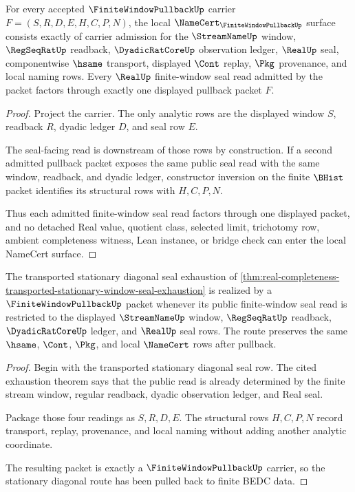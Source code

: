 \begin{theorem}
\label{thm:finite-window-pullback-namecert-obligations}
For every accepted $\FiniteWindowPullbackUp$ carrier $F=(S,R,D,E,H,C,P,N)$, the local $\NameCert_{\FiniteWindowPullbackUp}$ surface consists exactly of carrier admission for the $\StreamNameUp$ window, $\RegSeqRatUp$ readback, $\DyadicRatCoreUp$ observation ledger, $\RealUp$ seal, componentwise $\hsame$ transport, displayed $\Cont$ replay, $\Pkg$ provenance, and local naming rows. Every $\RealUp$ finite-window seal read admitted by the packet factors through exactly one displayed pullback packet $F$.
\end{theorem}
\begin{proof}
Project the carrier. The only analytic rows are the displayed window $S$, readback $R$, dyadic ledger $D$, and seal row $E$.

The seal-facing read is downstream of those rows by construction. If a second admitted pullback packet exposes the same public seal read with the same window, readback, and dyadic ledger, constructor inversion on the finite $\BHist$ packet identifies its structural rows with $H,C,P,N$.

Thus each admitted finite-window seal read factors through one displayed packet, and no detached Real value, quotient class, selected limit, trichotomy row, ambient completeness witness, Lean instance, or bridge check can enter the local NameCert surface.
\end{proof}

\begin{theorem}
\label{thm:finite-window-pullback-stationary-diagonal-route}
The transported stationary diagonal seal exhaustion of \autoref{thm:real-completeness-transported-stationary-window-seal-exhaustion} is realized by a $\FiniteWindowPullbackUp$ packet whenever its public finite-window seal read is restricted to the displayed $\StreamNameUp$ window, $\RegSeqRatUp$ readback, $\DyadicRatCoreUp$ ledger, and $\RealUp$ seal rows. The route preserves the same $\hsame$, $\Cont$, $\Pkg$, and local $\NameCert$ rows after pullback.
\end{theorem}
\begin{proof}
Begin with the transported stationary diagonal seal row. The cited exhaustion theorem says that the public read is already determined by the finite stream window, regular readback, dyadic observation ledger, and Real seal.

Package those four readings as $S,R,D,E$. The structural rows $H,C,P,N$ record transport, replay, provenance, and local naming without adding another analytic coordinate.

The resulting packet is exactly a $\FiniteWindowPullbackUp$ carrier, so the stationary diagonal route has been pulled back to finite BEDC data.
\end{proof}

